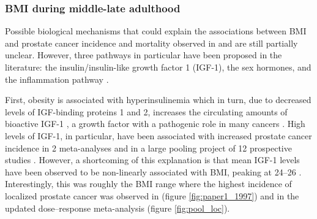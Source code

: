 \subsubsection{BMI during middle-late adulthood}

Possible biological mechanisms that could explain the associations between BMI and prostate cancer incidence and mortality observed in  and  are still partially unclear. However, three pathways in particular have been proposed in the literature: the insulin/insulin-like growth factor 1 (IGF-1), the sex hormones, and the inflammation pathway \citep{wiren_androgens_2008, roberts_biological_2010, renehan_adiposity_2015}. 

First, obesity is associated with hyperinsulinemia which in turn, due to decreased levels of IGF-binding proteins 1 and 2, increases the circulating amounts of bioactive IGF-1 \citep{nam_effect_1997}, a growth factor with a pathogenic role in many cancers \citep{roberts_biological_2010}. High levels of IGF-1, in particular, have been associated with increased prostate cancer incidence in 2 meta-analyses \citep{renehan_insulinlike_2004, rowlands_circulating_2009} and in a large pooling project of 12 prospective studies \citep{roddam_insulinlike_2008}. However, a shortcoming of this explanation is that mean IGF-1 levels have been observed to be non-linearly associated with BMI, peaking at 24--26 \kgmsq{} \citep{yamamoto_relationship_1993, lukanova_nonlinear_2002}. Interestingly, this was roughly the BMI range where the highest incidence of localized prostate cancer was observed in  (figure \ref{fig:paper1_1997}) and in the updated dose--response meta-analysis (figure \ref{fig:pool_loc}).


